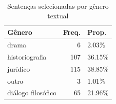 
\begin{table}[!htb]

\caption{\label{tab:porgenero}Sentenças selecionadas por gênero textual}
\centering
\begin{tabular}[t]{lrl}
\toprule
Gênero & Freq. & Prop.\\
\midrule
drama & 6 & 2.03\%\\
historiografia & 107 & 36.15\%\\
jurídico & 115 & 38.85\%\\
outro & 3 & 1.01\%\\
diálogo filosófico & 65 & 21.96\%\\
\bottomrule
\end{tabular}
\end{table}
